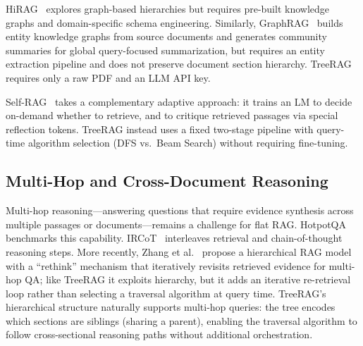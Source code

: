 \documentclass[sigconf,review,anonymous]{acmart}
\begin{document}
HiRAG~\cite{huang2025hirag} explores graph-based hierarchies but requires
pre-built knowledge graphs and domain-specific schema engineering. Similarly,
GraphRAG~\cite{edge2025graphrag} builds entity knowledge graphs from source
documents and generates community summaries for global query-focused
summarization, but requires an entity extraction pipeline and does not preserve
document section hierarchy. TreeRAG requires only a raw PDF and an LLM API key.

Self-RAG~\cite{asai2024selfrag} takes a complementary adaptive approach: it
trains an LM to decide on-demand whether to retrieve, and to critique retrieved
passages via special reflection tokens. TreeRAG instead uses a fixed two-stage
pipeline with query-time algorithm selection (DFS vs.\ Beam Search) without
requiring fine-tuning.

\subsection{Multi-Hop and Cross-Document Reasoning}
Multi-hop reasoning---answering questions that require evidence synthesis across
multiple passages or documents---remains a challenge for flat RAG.
HotpotQA~\cite{yang2018hotpotqa} benchmarks this capability.
IRCoT~\cite{trivedi2023ircot} interleaves retrieval and
chain-of-thought~\cite{wei2022cot} reasoning steps. More recently, Zhang et
al.~\cite{zhang2024hierarchical} propose a hierarchical RAG model with a
``rethink'' mechanism that iteratively revisits retrieved evidence for multi-hop
QA; like TreeRAG it exploits hierarchy, but it adds an iterative re-retrieval
loop rather than selecting a traversal algorithm at query time. TreeRAG's
hierarchical structure naturally supports multi-hop queries: the tree encodes
which sections are siblings (sharing a parent), enabling the traversal algorithm
to follow cross-sectional reasoning paths without additional orchestration.
\end{document}
